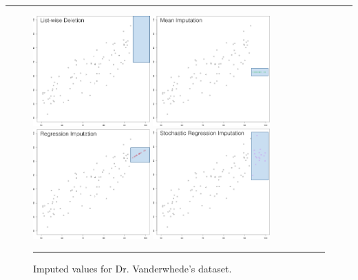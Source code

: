 \begin{center}
    \rule{0.5\textwidth}{.4pt}
\end{center}
\begin{figure}[t]
\centering
\includegraphics[width=0.4\textwidth]{Images/listwisedeletion.png}
\quad
\includegraphics[width=0.4\textwidth]{Images/mean.png} \\
\includegraphics[width=0.4\textwidth]{Images/regression.png} 
\quad
\includegraphics[width=0.4\textwidth]{Images/stochastic.png}
\caption[\small Imputed values for Dr. Vanderwhede's dataset]{\small Imputed values for Dr. Vanderwhede's dataset.}
\hrule\label{fig:theimputations}
\end{figure}
